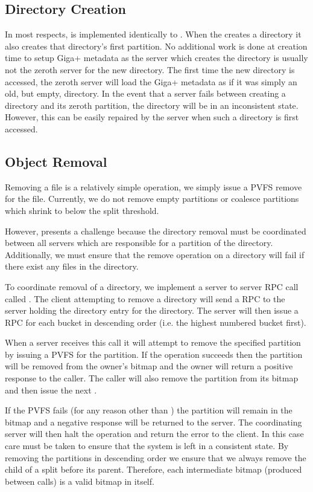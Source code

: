 \documentclass[onecolumn, 11pt, letterpaper]{article}
\begin{document}
\subsection{Directory Creation}
In most respects,  is implemented identically to .
When the  creates a directory it also creates that
directory's first partition.  No additional work is done at creation time to
setup Giga+ metadata as the server which creates the directory is usually not
the zeroth server for the new directory.  The first time the new directory is
accessed, the zeroth server will load the Giga+ metadata as if it was simply
an old, but empty, directory.  In the event that a server fails between
creating a directory and its zeroth partition, the directory will be in an
inconsistent state.  However, this can be easily repaired by the server when
such a directory is first accessed.

\subsection{Object Removal}
Removing a file is a relatively simple operation, we simply issue a PVFS
remove for the file.  Currently, we do not remove empty partitions or
coalesce partitions which shrink to below the split threshold.

However,  presents a challenge because the directory removal must
be coordinated between all servers which are responsible for a partition of
the directory.  Additionally, we must ensure that the remove operation on a
directory will fail if there exist any files in the directory.

To coordinate removal of a directory, we implement a server to server RPC call
called .  The client attempting to remove a directory
will send a  RPC to the server holding the directory entry for
the directory.  The server will then issue a  RPC for
each bucket in descending order (i.e. the highest numbered bucket first).  

When a server receives this call it will attempt to remove the specified
partition by issuing a PVFS  for the partition.  If the operation
succeeds then the partition will be removed from the owner's bitmap and the
owner will return a positive response to the caller.  The caller will also
remove the partition from its bitmap and then issue the next
.

If the PVFS  fails (for any reason other than ) the
partition will remain in the bitmap and a negative response will be returned
to the server.  The coordinating server will then halt the operation and
return the error to the client.  In this case care must be taken to ensure
that the system is left in a consistent state.  By removing the partitions in
descending order we ensure that we always remove the child of a split before
its parent.  Therefore, each intermediate bitmap (produced between
 calls) is a valid bitmap in itself.
\end{document}
